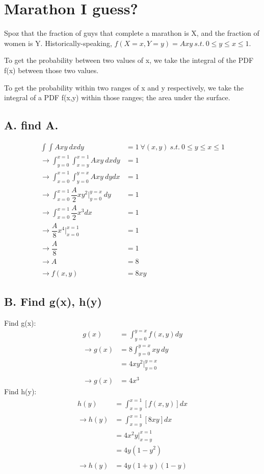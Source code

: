 \documentclass[]{article}
\begin{document}
	\pagebreak
		
	\section{Marathon I guess?}
		Spoz that the fraction of guys that complete a marathon is X, and the fraction of women is Y. Historically-speaking, $f(X=x, Y=y) = Axy\ s.t.\ 0\leq y\leq x\leq 1$.
		
		To get the probability between two values of x, we take the integral of the PDF f(x)  between those two values.
		
		To get the probability within two ranges of x and y respectively, we take the integral of a PDF f(x,y) within those ranges; the area under the surface.
		
		\subsection{A. find A.}
		
		\begin{align*}
			\int\int Axy\ dxdy &= 1\ \forall (x,y)\ s.t.\ 0\leq y\leq x\leq 1\\
			\to \int_{y=0}^{x=1} \int_{x=y}^{x=1} Axy\ dxdy &= 1 \\
			\to \int_{x=0}^{x=1} \int_{y=0}^{y=x} Axy\ dydx &= 1 \\
			\to \int_{x=0}^{x=1} \dfrac{A}{2}xy^2 |_{y=0}^{y=x}\ dy &= 1 \\
			\to \int_{x=0}^{x=1} \dfrac{A}{2}x^3 dx &= 1 \\
			\to \dfrac{A}{8}x^4 |_{x=0}^{x=1} &= 1 \\
			\to \dfrac{A}{8} &= 1 \\
			\to A &= 8 \\\\
			\to f(x,y) &= 8xy
		\end{align*}
		
		\pagebreak
		\subsection{B. Find g(x), h(y)}
		Find g(x):
		\begin{align*}
			g(x) &= \int_{y=0}^{y=x}f(x,y)dy \\
			\to g(x) &= 8\int_{y=0}^{y=x}xy\ dy \\
			         &= 4xy^2|_{y=0}^{y=x} \\\\
			\to g(x) &= 4x^3
		\end{align*}
		Find h(y):
		\begin{align*}
			    h(y) &= \int_{x=y}^{x=1}[f(x,y)]dx \\
			\to h(y) &= \int_{x=y}^{x=1}[8xy]dx \\
			         &= 4x^2y|_{x=y}^{x=1} \\
			         &= 4y(1 - y^2) \\\\
			\to h(y) &= 4y(1+y)(1-y)
		\end{align*}
		
\end{document}
